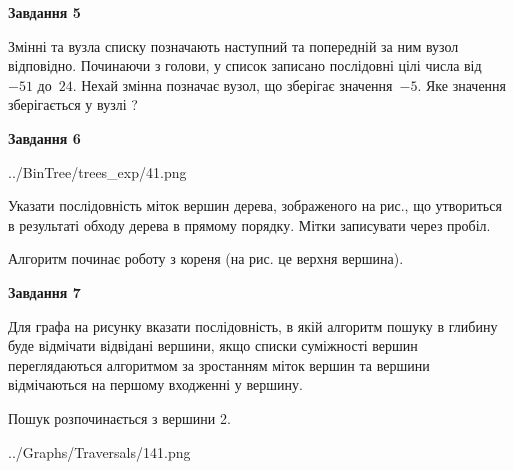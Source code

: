 \documentclass[12pt, ukrainian]{article}
\begin{document}
{\begin {large}
{\begin {center}\textbf{Завдання 5}\end {center}}\par
Змінні  та  вузла списку позначають наступний та попередній за ним вузол відповідно. Починаючи з голови, у список записано послідовні цілі числа від~$-51$ до~$24$. Нехай змінна  позначає вузол, що зберігає значення~$-5$.
Яке значення зберігається у вузлі  ?\par
\newpage

{\begin {center}\textbf{Завдання 6}\end {center}}\par

\begin{center}
	{../BinTree/trees_exp/41.png}
\end{center}
Указати послідовність міток вершин дерева, зображеного на рис., що утвориться в результаті обходу дерева в прямому порядку. Мітки записувати через пробіл.\par Алгоритм починає роботу з кореня (на рис. це верхня вершина).\par
\newpage

{\begin {center}\textbf{Завдання 7}\end {center}}\par
Для графа на рисунку вказати послідовність, в якій алгоритм пошуку в глибину буде відмічати відвідані вершини, якщо списки суміжності вершин переглядаються алгоритмом за зростанням міток вершин та вершини відмічаються на першому вход\-женні у вершину.\par
Пошук розпочинається з вершини 2.\par

\begin{center}
	{../Graphs/Traversals/141.png}
\end{center}\par
\newpage


\end{large}}
\end{document}
